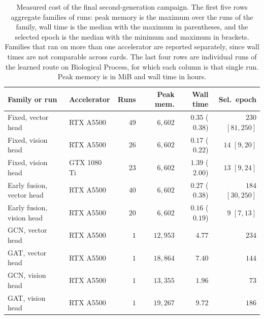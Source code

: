 \documentclass[Ingles]{ic-tese-v3}
\begin{document}
\begin{appendices}{}
\begin{table}[!htb]
  \centering
  \small
  \caption{Measured cost of the final second-generation campaign. The first five rows aggregate
  families of runs: peak memory is the maximum over the runs of the family, wall time is the median
  with the maximum in parentheses, and the selected epoch is the median with the minimum and maximum
  in brackets. Families that ran on more than one accelerator are reported separately, since wall
  times are not comparable across cards. The last four rows are individual runs of the learned route
  on Biological Process, for which each column is that single run. Peak memory is in MiB and wall time
  in hours.}
  \label{tab:ape_custo}
  \begin{tabular}{llrrrr}
    \hline
    \textbf{Family or run} & \textbf{Accelerator} & \textbf{Runs} & \textbf{Peak mem.} &
    \textbf{Wall time} & \textbf{Sel.\ epoch} \\
    \hline  
    Fixed, vector head        & RTX A5500   & $49$ & $6{,}602$  & $0.35$ ($0.38$) & $230$ $[81,250]$ \\
    Fixed, vision head        & RTX A5500   & $26$ & $6{,}602$  & $0.17$ ($0.22$) & $14$ $[9,20]$ \\
    Fixed, vision head        & GTX 1080 Ti & $23$ & $6{,}602$  & $1.39$ ($2.00$) & $13$ $[9,24]$ \\
    Early fusion, vector head & RTX A5500   & $40$ & $6{,}602$  & $0.27$ ($0.38$) & $184$ $[30,250]$ \\
    Early fusion, vision head & RTX A5500   & $20$ & $6{,}602$  & $0.16$ ($0.19$) & $9$ $[7,13]$ \\
    \hline
    GCN, vector head          & RTX A5500 & $1$ & $12{,}953$ & $4.77$ & $234$ \\
    GAT, vector head          & RTX A5500 & $1$ & $18{,}864$ & $7.40$ & $144$ \\
    GCN, vision head          & RTX A5500 & $1$ & $13{,}355$ & $1.96$ & $73$ \\
    GAT, vision head          & RTX A5500 & $1$ & $19{,}267$ & $9.72$ & $186$ \\
    \hline
  \end{tabular}
\end{table}



\end{appendices}
\end{document}
